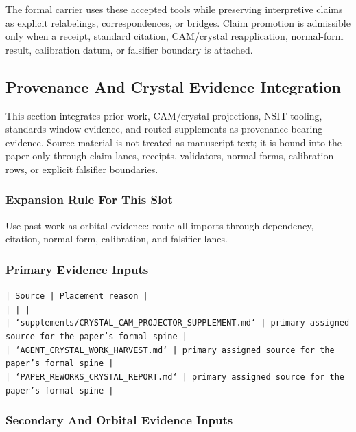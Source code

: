 \documentclass[11pt]{article}
\begin{document}
The formal carrier uses these accepted tools while preserving interpretive
claims as explicit relabelings, correspondences, or bridges. Claim promotion is admissible only when a receipt, standard citation,
CAM/crystal reapplication, normal-form result, calibration datum, or falsifier
boundary is attached.

\subsection*{Provenance And Crystal Evidence Integration}

This section integrates prior work, CAM/crystal projections, NSIT tooling,
standards-window evidence, and routed supplements as provenance-bearing
evidence. Source material is not treated as manuscript text; it is bound into
the paper only through claim lanes, receipts, validators, normal forms,
calibration rows, or explicit falsifier boundaries.

\subsubsection*{Expansion Rule For This Slot}

Use past work as orbital evidence: route all imports through dependency, citation, normal-form, calibration, and falsifier lanes.

\subsubsection*{Primary Evidence Inputs}

\noindent\texttt{| Source | Placement reason |}\\
\noindent\texttt{|---|---|}\\
\noindent\texttt{| `supplements/CRYSTAL\_CAM\_PROJECTOR\_SUPPLEMENT.md` | primary assigned source for the paper's formal spine |}\\
\noindent\texttt{| `AGENT\_CRYSTAL\_WORK\_HARVEST.md` | primary assigned source for the paper's formal spine |}\\
\noindent\texttt{| `PAPER\_REWORKS\_CRYSTAL\_REPORT.md` | primary assigned source for the paper's formal spine |}\\

\subsubsection*{Secondary And Orbital Evidence Inputs}
\end{document}
